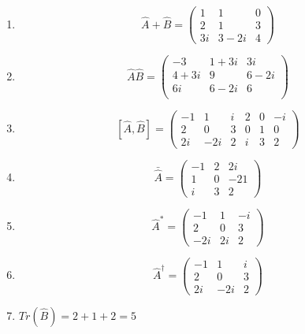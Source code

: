 \documentclass[12pt]{article}
\begin{document}
\begin{enumerate}[label=\alph{*})]
\item %
$$\hat{A}+\hat{B} = \left(\begin{matrix}
1 & 1 & 0 \\
2 & 1 & 3 \\
3i & 3-2i & 4
\end{matrix}\right)$$

\item %
$$\hat{A}\hat{B} = \left(\begin{matrix}
-3 & 1+3 i & 3 i \\
4+3 i & 9 & 6-2 i \\
6 i & 6-2 i & 6 \\
\end{matrix}\right)$$

\item %
$$\left[\hat{A}, \hat{B}\right] = 
\left(\begin{matrix}
-1 & 1 & i & 2 & 0 & -i\\
2 & 0 & 3 & 0 & 1 & 0 \\
2i & -2i & 2 & i & 3 & 2
\end{matrix}\right)$$

\item %
$$\bar{\hat{A}} = \left(\begin{matrix}
-1 & 2 & 2i \\ 
1 & 0 & -21 \\
i  & 3 & 2
\end{matrix}\right)$$

\item %
$$\hat{A}^* = \left(\begin{matrix}
-1 & 1 & -i \\
2 & 0 & 3 \\
-2i & 2i & 2
\end{matrix}\right)$$

\item %
$$\hat{A}^\dagger = \left(\begin{matrix}
-1 & 1 & i \\
2 & 0 & 3 \\
2i & -2i & 2
\end{matrix}\right)$$

\item %
$Tr(\hat{B}) = 2 + 1 + 2 = 5$
\end{enumerate}
\end{document}
